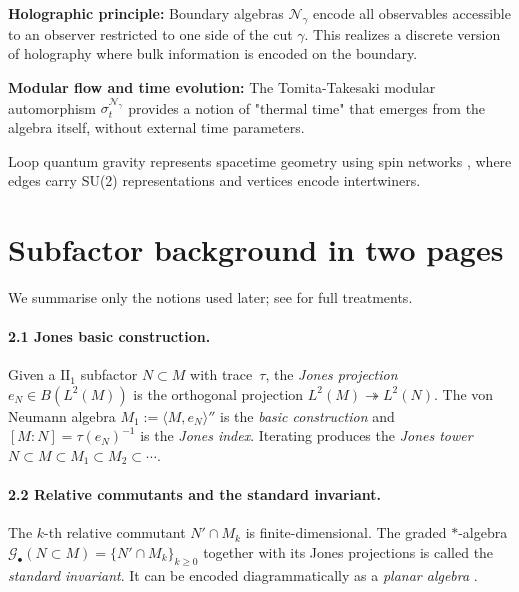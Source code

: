 \documentclass[11pt]{article}
\begin{document}
\textbf{Holographic principle:} Boundary algebras $\mathcal{N}_\gamma$ encode all 
observables accessible to an observer restricted to one side of the cut $\gamma$. 
This realizes a discrete version of holography where bulk information is encoded 
on the boundary.

\textbf{Modular flow and time evolution:} The Tomita-Takesaki modular automorphism 
$\sigma_t^{\mathcal{N}_\gamma}$ provides a notion of "thermal time" \cite{ConnesRovelli} 
that emerges from the algebra itself, without external time parameters.

Loop quantum gravity \cite{Rovelli2004,AshtekarLewandowski2004} represents 
spacetime geometry using spin networks \cite{RovelliSmolin1995,Penrose1971}, 
where edges carry SU(2) representations and vertices encode intertwiners.

\section{Subfactor background in two pages}\label{sec:primer}
We summarise only the notions used later; see \cite{Jones1983, JonesPA,
PopaCBMS} for full treatments.

\paragraph{2.1  Jones basic construction.}
Given a $\mathrm{II}_1$ subfactor $N\subset M$ with trace~$\tau$, the
\emph{Jones projection} $e_N\in B(L^2(M))$ is the orthogonal projection
$L^2(M)\twoheadrightarrow L^2(N)$.  The von Neumann algebra
$M_1:=\langle M,e_N\rangle''$ is the \emph{basic construction} and
$[M:N]=\tau(e_N)^{-1}$ is the \emph{Jones index}.  Iterating produces the
\emph{Jones tower} $N\subset M\subset M_1\subset M_2\subset\cdots$.

\paragraph{2.2  Relative commutants and the standard invariant.}
The $k$-th relative commutant $N'\!\cap M_k$ is finite-dimensional.
The graded $\ast$-algebra
\(
   \mathcal G_{\bullet}(N\subset M)
   =\bigl\{N'\!\cap M_k\}_{k\ge0}
\)
together with its Jones projections is called the \emph{standard
invariant}.  It can be encoded diagrammatically as a \emph{planar algebra}
\cite{JonesPA}.
\end{document}
